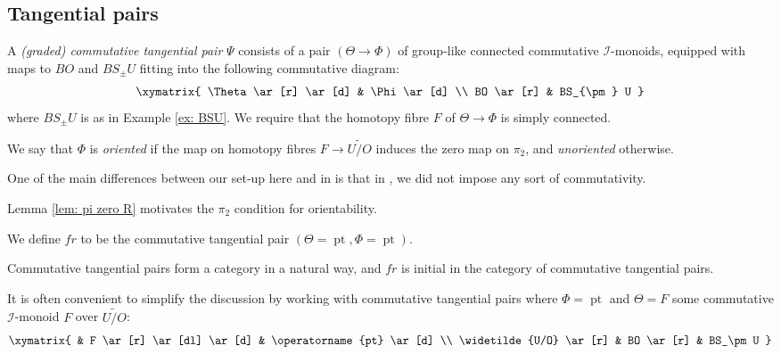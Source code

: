 \documentclass{TPmod}
\newcommand{\pt}{\operatorname{pt}}
\newcommand{\cI}{\mathcal{I}}
\numberwithin{equation}{section}
\begin{document}
\subsection{Tangential pairs}
    \begin{defn}\label{def: comm tang pair}
        A \emph{(graded) commutative tangential pair} $\Psi$ consists of a pair $(\Theta \to \Phi)$ of group-like connected commutative $\cI$-monoids, equipped with maps to $BO$ and $BS_\pm U$ fitting into the following commutative diagram:
        \begin{equation}
            \xymatrix{
                \Theta 
                \ar[r]
                \ar[d]
                &
                \Phi
                \ar[d]
                \\
                BO
                \ar[r]
                &
                BS_{\pm} U
            }
        \end{equation}
        where $BS_{\pm} U$ is as in Example \ref{ex: BSU}. We require that the homotopy fibre $F$ of $\Theta \to \Phi$ is simply connected.

        We say that $\Phi$ is \emph{oriented} if the map on homotopy fibres $F \to \widetilde{U/O}$ induces the zero map on $\pi_2$, and \emph{unoriented} otherwise. 
        
    \end{defn}
    One of the main differences between our set-up here and in \cite{PS2} is that in \cite{PS2}, we did not impose any sort of commutativity.
    \begin{rmk}
        Lemma \ref{lem: pi zero R} motivates the $\pi_2$ condition for orientability.
    \end{rmk}
    \begin{ex}
        We define $fr$ to be the commutative tangential pair $(\Theta=\pt, \Phi=\pt)$.
        
        Commutative tangential pairs form a category in a natural way, and $fr$ is initial in the category of commutative tangential pairs.
    \end{ex}
    \begin{ex}\label{ex: tang str}
        It is often convenient to simplify the discussion by working with commutative tangential pairs where $\Phi=\pt$ and $\Theta=F$ some commutative $\cI$-monoid $F$ over $\widetilde{U/O}$:
        \begin{equation}
            \xymatrix{
                &
                F
                \ar[r]
                \ar[dl]
                \ar[d]
                &
                \pt
                \ar[d]
                \\
                \widetilde{U/O}
                \ar[r]
                &
                BO
                \ar[r]
                &
                BS_\pm U
            }
        \end{equation}
    \end{ex}
\end{document}
